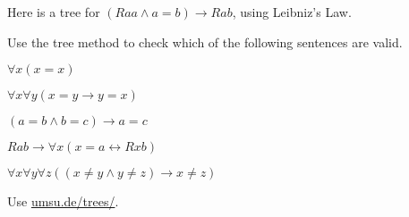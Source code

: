 
\bigskip

Here is a tree for $(Raa \land a\!=\!b) \to Rab$, using Leibniz's Law.

\medskip
\begin{center}
\end{center}


\begin{exercise}
  Use the tree method to check which of the following sentences are valid.
  \begin{exlist}
  \item $\forall x (x\!=\!x)$
  \item $\forall x \forall y(x\!=\!y \to y\!=\!x)$
  \item $(a=b \land b=c) \to a=c$
  \item $Rab \to \forall x(x=a \leftrightarrow Rxb)$
  \item $\forall x \forall y\forall z((x\not= y \land y\not= z) \to x \not= z)$
  \end{exlist}
\end{exercise}
\begin{solution}
  Use \href{https://www.umsu.de/trees/}{umsu.de/trees/}.
\end{solution}

